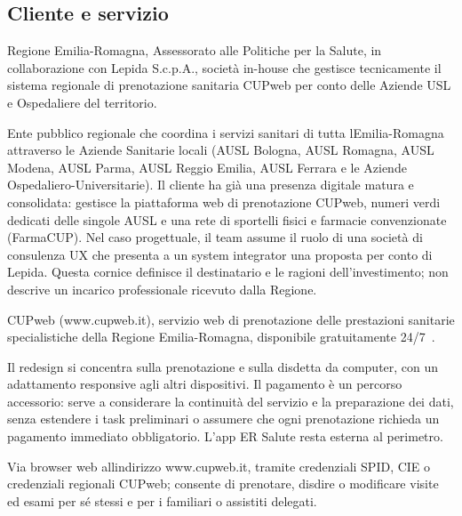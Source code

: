 \label{doc:a:02}

\subsection{Cliente e servizio}


Regione Emilia-Romagna, Assessorato alle Politiche per la Salute, in
collaborazione con Lepida S.c.p.A., società in-house che gestisce
tecnicamente il sistema regionale di prenotazione sanitaria CUPweb
per conto delle Aziende USL
e Ospedaliere del territorio.


Ente pubblico regionale che coordina i servizi sanitari di tutta
l\textquotesingle Emilia-Romagna attraverso le Aziende Sanitarie locali
(AUSL Bologna, AUSL Romagna, AUSL Modena, AUSL Parma, AUSL Reggio
Emilia, AUSL Ferrara e le Aziende Ospedaliero-Universitarie). Il cliente
ha già una presenza digitale matura e consolidata: gestisce la piattaforma
web di prenotazione CUPweb, numeri verdi dedicati delle singole AUSL e una rete di sportelli fisici e farmacie
convenzionate (FarmaCUP). Nel caso progettuale, il team assume il ruolo di
una società di consulenza UX che presenta a un system integrator una
proposta per conto di Lepida. Questa cornice definisce il destinatario e
le ragioni dell'investimento; non descrive un incarico professionale
ricevuto dalla Regione.


CUPweb (www.cupweb.it), servizio web di prenotazione delle prestazioni
sanitarie specialistiche della Regione Emilia-Romagna, disponibile
gratuitamente 24/7~\cite{rerPrenotare}.

Il redesign si concentra sulla prenotazione e sulla disdetta da computer,
con un adattamento responsive agli altri dispositivi. Il pagamento è un
percorso accessorio: serve a considerare la continuità del servizio e la
preparazione dei dati, senza estendere i task preliminari o assumere che
ogni prenotazione richieda un pagamento immediato obbligatorio. L'app ER Salute resta
esterna al perimetro.


Via browser web all\textquotesingle indirizzo www.cupweb.it, tramite credenziali SPID, CIE o credenziali regionali
CUPweb; consente di prenotare, disdire o modificare visite ed esami per sé
stessi e per i familiari o assistiti delegati.

